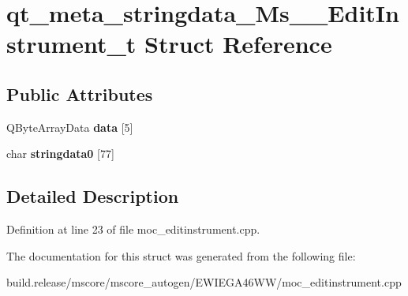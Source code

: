 \hypertarget{structqt__meta__stringdata___ms_____edit_instrument__t}{}\section{qt\+\_\+meta\+\_\+stringdata\+\_\+\+Ms\+\_\+\+\_\+\+Edit\+Instrument\+\_\+t Struct Reference}
\label{structqt__meta__stringdata___ms_____edit_instrument__t}
\subsection*{Public Attributes}
\begin{DoxyCompactItemize}
\item 
\mbox{\label{structqt__meta__stringdata___ms_____edit_instrument__t_a7e193e693e594e55ad62baad412c260e}} 
Q\+Byte\+Array\+Data {\bfseries data} \mbox{[}5\mbox{]}
\item 
\mbox{\label{structqt__meta__stringdata___ms_____edit_instrument__t_aaca34deb40148f1d07a2c406431433cd}} 
char {\bfseries stringdata0} \mbox{[}77\mbox{]}
\end{DoxyCompactItemize}


\subsection{Detailed Description}


Definition at line 23 of file moc\+\_\+editinstrument.\+cpp.



The documentation for this struct was generated from the following file\+:\begin{DoxyCompactItemize}
\item 
build.\+release/mscore/mscore\+\_\+autogen/\+E\+W\+I\+E\+G\+A46\+W\+W/moc\+\_\+editinstrument.\+cpp\end{DoxyCompactItemize}
